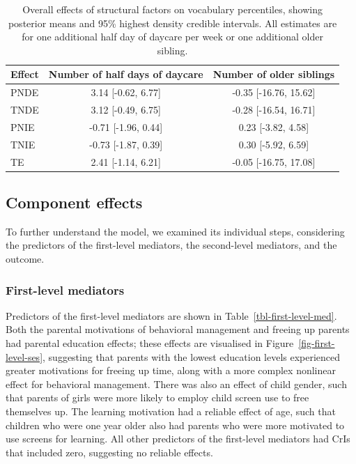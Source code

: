 \documentclass[
  man,
  floatsintext,
  longtable,
  nolmodern,
  notxfonts,
  notimes,
  colorlinks=true,linkcolor=blue,citecolor=blue,urlcolor=blue]{apa7}
\begin{document}
\begin{table}

{\caption{{Overall effects of structural factors on vocabulary
percentiles, showing posterior means and 95\% highest density credible
intervals. All estimates are for one additional half day of daycare per
week or one additional older sibling.}{\label{tbl-overall-effects}}}}

\fontsize{12.0pt}{14.4pt}\selectfont
\begin{tabular*}{\linewidth}{@{\extracolsep{\fill}}lcc}
\toprule
Effect & Number of half days of daycare & Number of older siblings \\ 
\midrule\addlinespace[2.5pt]
PNDE & 3.14 {[}-0.62, 6.77{]} & -0.35 {[}-16.76, 15.62{]} \\ 
TNDE & 3.12 {[}-0.49, 6.75{]} & -0.28 {[}-16.54, 16.71{]} \\ 
PNIE & -0.71 {[}-1.96, 0.44{]} & 0.23 {[}-3.82, 4.58{]} \\ 
TNIE & -0.73 {[}-1.87, 0.39{]} & 0.30 {[}-5.92, 6.59{]} \\ 
TE & 2.41 {[}-1.14, 6.21{]} & -0.05 {[}-16.75, 17.08{]} \\ 
\bottomrule
\end{tabular*}

\end{table}

\subsection{Component effects}\label{component-effects}

To further understand the model, we examined its individual steps,
considering the predictors of the first-level mediators, the
second-level mediators, and the outcome.

\subsubsection{First-level mediators}\label{first-level-mediators}

Predictors of the first-level mediators are shown in
Table~\ref{tbl-first-level-med}. Both the parental motivations of
behavioral management and freeing up parents had parental education
effects; these effects are visualised in
Figure~\ref{fig-first-level-ses}, suggesting that parents with the
lowest education levels experienced greater motivations for freeing up
time, along with a more complex nonlinear effect for behavioral
management. There was also an effect of child gender, such that parents
of girls were more likely to employ child screen use to free themselves
up. The learning motivation had a reliable effect of age, such that
children who were one year older also had parents who were more
motivated to use screens for learning. All other predictors of the
first-level mediators had CrIs that included zero, suggesting no
reliable effects.
\end{document}
